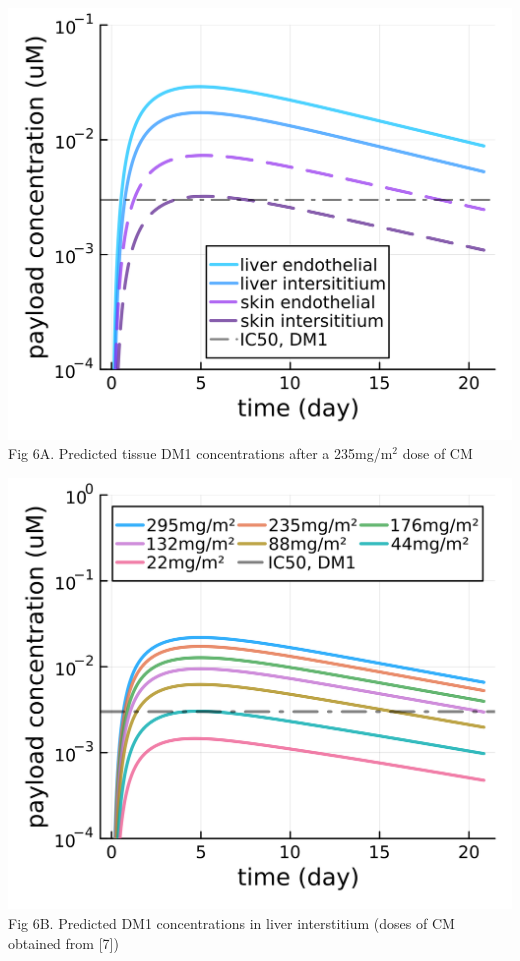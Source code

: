 \documentclass[portrait,fontscale=0.3,paperwidth=36in,paperheight=48in]{baposter}
\begin{document}
\begin{poster}
{\begin{minipage}[c]{0.48\linewidth}
\end{minipage}
\hspace{0.01\linewidth}
\begin{minipage}[c]{0.24\linewidth}
\centering
\includegraphics[width= \textwidth]{../img/tissue-payload-cm-235mgm2.png}
\scriptsize{Fig 6A. Predicted tissue DM1 concentrations after a 235mg/m$^2$ dose of CM}
\end{minipage}
\hspace{0.01\linewidth}
\begin{minipage}[c]{0.24\linewidth}
\centering
\includegraphics[width= \textwidth]{../img/tissue-payload-cm-liver-init.png}
\scriptsize{Fig 6B. Predicted DM1 concentrations in liver interstitium (doses of CM obtained from [7])}
\end{minipage}


}
\end{poster}
\end{document}
